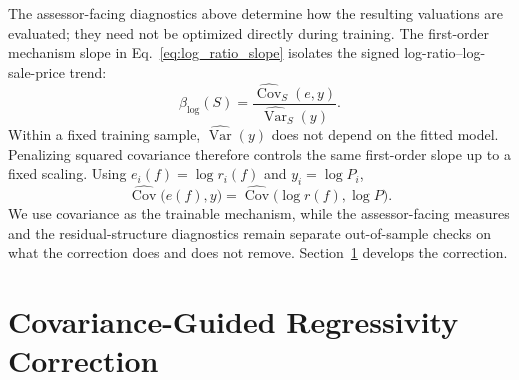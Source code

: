 \documentclass[10pt]{article}
\theoremstyle{definition}
\newcommand{\1}{\mathbf{1}}
\begin{document}

{The assessor-facing diagnostics above determine how the resulting valuations are evaluated; they need not be optimized directly during training. The first-order mechanism slope in Eq.~\eqref{eq:log_ratio_slope} isolates the signed log-ratio--log-sale-price trend:
\[
\beta_{\log}(S)
=
\frac{\widehat{\operatorname{Cov}}_S(e,y)}
{\widehat{\operatorname{Var}}_S(y)}.
\]
Within a fixed training sample, $\widehat{\operatorname{Var}}(y)$ does not depend on the fitted model. Penalizing squared covariance therefore controls the same first-order slope up to a fixed scaling. Using $e_i(f)=\log r_i(f)$ and $y_i=\log P_i$,
\begin{equation}
\label{eq:training_covariance_bridge}
\widehat{\operatorname{Cov}}\bigl(e(f),y\bigr)
=
\widehat{\operatorname{Cov}}\bigl(\log r(f),\log P\bigr).
\end{equation}
We use covariance as the trainable mechanism, while the assessor-facing measures and the residual-structure diagnostics remain separate out-of-sample checks on what the correction does and does not remove. Section~\ref{sec:method} develops the correction.}



\section{Covariance-Guided Regressivity Correction}
\label{sec:method}

\end{document}
